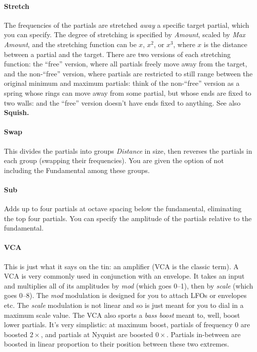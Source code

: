 \documentclass{article}
\begin{document}
\paragraph{Stretch} The frequencies of the partials are stretched {\it away} a specific target partial, which you can specify.  The degree of stretching is specified by {\it Amount}, scaled by {\it Max Amount}, and the stretching function can be \(x\), \(x^2\), or \(x^3\), where \(x\) is the distance between a partial and the target.  There are two versions of each stretching function: the ``free'' version, where all partials freely move away from the target, and the non-``free'' version, where partials are restricted to still range between the original minimum and maximum partials: think of the non-``free'' version as a spring whose rings can move away from some partial, but whose ends are fixed to two walls: and the ``free'' version doesn't have ends fixed to anything.  See also  {\bf Squish.}

\paragraph{Swap} This divides the partials into groups {\it Distance} in size, then reverses the partials in each group (swapping their frequencies).  You are given the option of not including the Fundamental among these groups.

\paragraph{Sub} Adds up to four partials at octave spacing below the fundamental, eliminating the top four partials.  You can specify the amplitude of the partials relative to the fundamental.

\paragraph{VCA} This is just what it says on the tin: an amplifier (VCA is the classic term).  A VCA is very commonly used in conjunction with an envelope.  It takes an input and multiplies all of its amplitudes by {\it mod} (which goes 0--1), then by {\it scale} (which goes 0--8).  The {\it mod} modulation is designed for you to attach LFOs or envelopes etc.  The {\it scale} modulation is not linear and so is just meant for you to dial in a maximum scale value.   The VCA also sports a {\it bass boost} meant to, well, boost lower partials.  It's very simplistic: at maximum boost, partials of frequency 0 are boosted \(2\times\), and partials at Nyquist are boosted \(0\times\).  Partials in-between are boosted in linear proportion to their position between these two extremes.  
\end{document}

